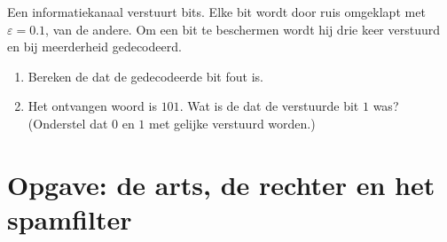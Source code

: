 \begin{exercise}[$\star\star\star$]\label{exo:g12:condprob:8}
Een informatiekanaal verstuurt bits. Elke bit wordt door ruis omgeklapt met
 $\varepsilon = 0.1$,  van de andere. Om een bit te
beschermen wordt hij drie keer verstuurd en bij meerderheid gedecodeerd.
\begin{enumerate}
  \item Bereken de  dat de gedecodeerde bit fout is.
  \item Het ontvangen woord is $101$. Wat is de  dat de verstuurde bit
        $1$ was? (Onderstel dat $0$ en $1$ met gelijke  verstuurd worden.)
\end{enumerate}
\end{exercise}

\section{Opgave: de arts, de rechter en het spamfilter}

